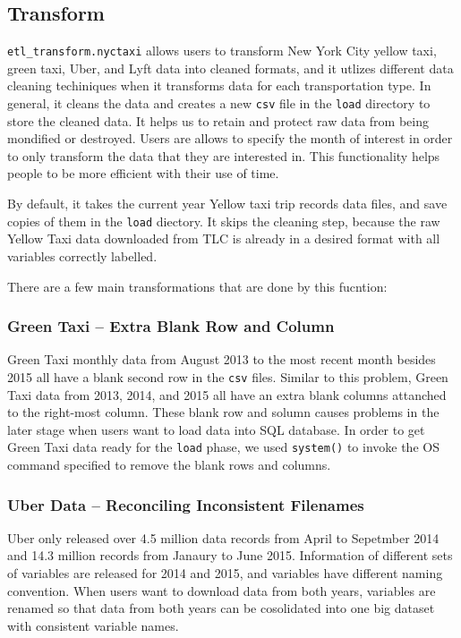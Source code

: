 \documentclass[12pt,twoside]{reedthesis}
\theoremstyle{definition}
\theoremstyle{definition}
\theoremstyle{definition}
\theoremstyle{remark}
\begin{document}
\subsection{Transform}\label{transform}

\texttt{etl\_transform.nyctaxi} allows users to transform New York City
yellow taxi, green taxi, Uber, and Lyft data into cleaned formats, and
it utlizes different data cleaning techiniques when it transforms data
for each transportation type. In general, it cleans the data and creates
a new \texttt{csv} file in the \texttt{load} directory to store the
cleaned data. It helps us to retain and protect raw data from being
mondified or destroyed. Users are allows to specify the month of
interest in order to only transform the data that they are interested
in. This functionality helps people to be more efficient with their use
of time.

By default, it takes the current year Yellow taxi trip records data
files, and save copies of them in the \texttt{load} diectory. It skips
the cleaning step, because the raw Yellow Taxi data downloaded from TLC
is already in a desired format with all variables correctly labelled.

There are a few main transformations that are done by this fucntion:

\subsubsection{Green Taxi -- Extra Blank Row and
Column}\label{green-taxi-extra-blank-row-and-column}

Green Taxi monthly data from August 2013 to the most recent month
besides 2015 all have a blank second row in the \texttt{csv} files.
Similar to this problem, Green Taxi data from 2013, 2014, and 2015 all
have an extra blank columns attanched to the right-most column. These
blank row and solumn causes problems in the later stage when users want
to load data into SQL database. In order to get Green Taxi data ready
for the \texttt{load} phase, we used \texttt{system()} to invoke the OS
command specified to remove the blank rows and columns.

\subsubsection{Uber Data -- Reconciling Inconsistent
Filenames}\label{uber-data-reconciling-inconsistent-filenames}

Uber only released over 4.5 million data records from April to Sepetmber
2014 and 14.3 million records from Janaury to June 2015. Information of
different sets of variables are released for 2014 and 2015, and
variables have different naming convention. When users want to download
data from both years, variables are renamed so that data from both years
can be cosolidated into one big dataset with consistent variable names.
\end{document}
